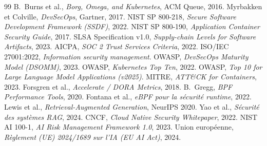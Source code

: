 \documentclass[12pt,a4paper,openany]{report}
\begin{document}
\begin{thebibliography}{99}
 B.~Burns et al., \textit{Borg, Omega, and Kubernetes}, ACM Queue, 2016.
 Myrbakken et Colville, \textit{DevSecOps}, Gartner, 2017.
 NIST SP 800-218, \textit{Secure Software Development Framework (SSDF)}, 2022.
 NIST SP 800-190, \textit{Application Container Security Guide}, 2017.
 SLSA Specification v1.0, \textit{Supply-chain Levels for Software Artifacts}, 2023.
 AICPA, \textit{SOC 2 Trust Services Criteria}, 2022.
 ISO/IEC 27001:2022, \textit{Information security management}.
 OWASP, \textit{DevSecOps Maturity Model (DSOMM)}, 2023.
 OWASP, \textit{Kubernetes Top Ten}, 2022.
 OWASP, \textit{Top 10 for Large Language Model Applications (v2025)}.
 MITRE, \textit{ATT\&CK for Containers}, 2023.
 Forsgren et al., \textit{Accelerate / DORA Metrics}, 2018.
 B.~Gregg, \textit{BPF Performance Tools}, 2020.
 Fontana et al., \textit{eBPF pour la sécurité runtime}, 2022.
 Lewis et al., \textit{Retrieval-Augmented Generation}, NeurIPS 2020.
 Yao et al., \textit{Sécurité des systèmes RAG}, 2024.
 CNCF, \textit{Cloud Native Security Whitepaper}, 2022.
 NIST AI 100-1, \textit{AI Risk Management Framework 1.0}, 2023.
 Union européenne, \textit{Règlement (UE) 2024/1689 sur l'IA (EU AI Act)}, 2024.
\end{thebibliography}
\end{document}
